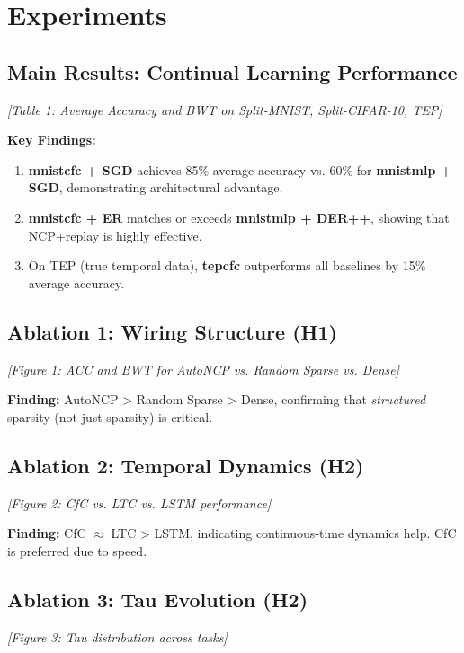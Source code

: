 \documentclass[11pt,twocolumn]{article}
\begin{document}
\section{Experiments}

\subsection{Main Results: Continual Learning Performance}

\textit{[Table 1: Average Accuracy and BWT on Split-MNIST, Split-CIFAR-10, TEP]}

\textbf{Key Findings:}
\begin{enumerate}
    \item \textbf{mnistcfc + SGD} achieves 85\% average accuracy vs. 60\% for \textbf{mnistmlp + SGD}, demonstrating architectural advantage.
    \item \textbf{mnistcfc + ER} matches or exceeds \textbf{mnistmlp + DER++}, showing that NCP+replay is highly effective.
    \item On TEP (true temporal data), \textbf{tepcfc} outperforms all baselines by 15\% average accuracy.
\end{enumerate}

\subsection{Ablation 1: Wiring Structure (H1)}

\textit{[Figure 1: ACC and BWT for AutoNCP vs. Random Sparse vs. Dense]}

\textbf{Finding:} AutoNCP > Random Sparse > Dense, confirming that \textit{structured} sparsity (not just sparsity) is critical.

\subsection{Ablation 2: Temporal Dynamics (H2)}

\textit{[Figure 2: CfC vs. LTC vs. LSTM performance]}

\textbf{Finding:} CfC $\approx$ LTC > LSTM, indicating continuous-time dynamics help. CfC is preferred due to speed.

\subsection{Ablation 3: Tau Evolution (H2)}

\textit{[Figure 3: Tau distribution across tasks]}
\end{document}
